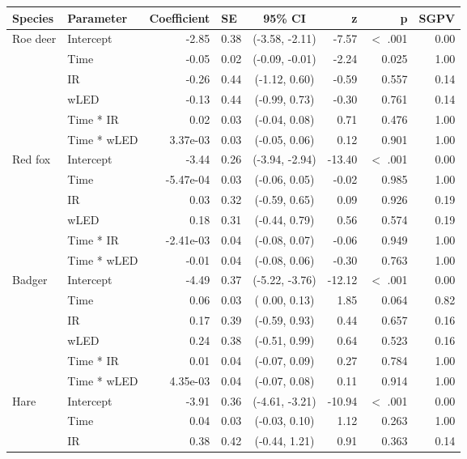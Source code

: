 \centering
\begin{tabular}[c]{llrlcrrr}
  \hline
Species & Parameter & Coefficient & SE & 95\% CI & z & p & SGPV \\ 
  \hline
Roe deer & Intercept & -2.85 & 0.38 & (-3.58, -2.11) & -7.57 & $<$ .001 & 0.00 \\ 
   & Time & -0.05 & 0.02 & (-0.09, -0.01) & -2.24 & 0.025  & 1.00 \\ 
   & IR & -0.26 & 0.44 & (-1.12,  0.60) & -0.59 & 0.557  & 0.14 \\ 
   & wLED & -0.13 & 0.44 & (-0.99,  0.73) & -0.30 & 0.761  & 0.14 \\ 
   & Time * IR & 0.02 & 0.03 & (-0.04,  0.08) & 0.71 & 0.476  & 1.00 \\ 
   & Time * wLED & 3.37e-03 & 0.03 & (-0.05,  0.06) & 0.12 & 0.901  & 1.00 \\ 
  Red fox & Intercept & -3.44 & 0.26 & (-3.94, -2.94) & -13.40 & $<$ .001 & 0.00 \\ 
   & Time & -5.47e-04 & 0.03 & (-0.06,  0.05) & -0.02 & 0.985  & 1.00 \\ 
   & IR & 0.03 & 0.32 & (-0.59,  0.65) & 0.09 & 0.926  & 0.19 \\ 
   & wLED & 0.18 & 0.31 & (-0.44,  0.79) & 0.56 & 0.574  & 0.19 \\ 
   & Time * IR & -2.41e-03 & 0.04 & (-0.08,  0.07) & -0.06 & 0.949  & 1.00 \\ 
   & Time * wLED & -0.01 & 0.04 & (-0.08,  0.06) & -0.30 & 0.763  & 1.00 \\ 
  Badger & Intercept & -4.49 & 0.37 & (-5.22, -3.76) & -12.12 & $<$ .001 & 0.00 \\ 
   & Time & 0.06 & 0.03 & ( 0.00,  0.13) & 1.85 & 0.064  & 0.82 \\ 
   & IR & 0.17 & 0.39 & (-0.59,  0.93) & 0.44 & 0.657  & 0.16 \\ 
   & wLED & 0.24 & 0.38 & (-0.51,  0.99) & 0.64 & 0.523  & 0.16 \\ 
   & Time * IR & 0.01 & 0.04 & (-0.07,  0.09) & 0.27 & 0.784  & 1.00 \\ 
   & Time * wLED & 4.35e-03 & 0.04 & (-0.07,  0.08) & 0.11 & 0.914  & 1.00 \\ 
  Hare & Intercept & -3.91 & 0.36 & (-4.61, -3.21) & -10.94 & $<$ .001 & 0.00 \\ 
   & Time & 0.04 & 0.03 & (-0.03,  0.10) & 1.12 & 0.263  & 1.00 \\ 
   & IR & 0.38 & 0.42 & (-0.44,  1.21) & 0.91 & 0.363  & 0.14 \\ 

\end{tabular}
